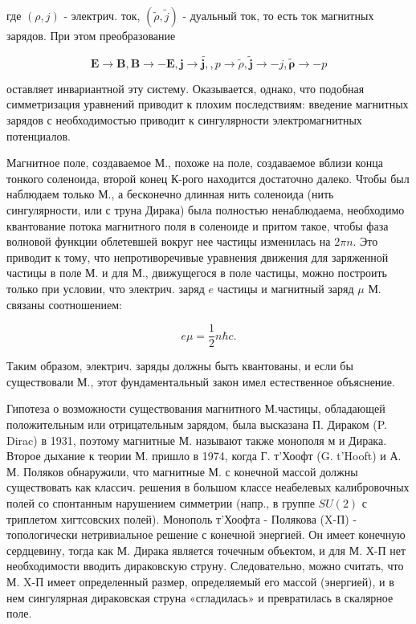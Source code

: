 \documentclass[10pt]{article}
\begin{document}
где $(\rho, j)$ - электрич. ток, $(\widetilde{\rho}, \widetilde{j})$ - дуальный ток, то есть ток магнитных зарядов. При этом преобразование



\[

\boldsymbol{E} \rightarrow \boldsymbol{B}, \boldsymbol{B} \rightarrow-\boldsymbol{E}, \boldsymbol{j} \rightarrow \tilde{\boldsymbol{j},}, p \rightarrow \tilde{\rho}, \tilde{\boldsymbol{j}} \rightarrow-j, \tilde{\boldsymbol{\rho}} \rightarrow-p

\]



оставляет инвариантной эту систему. Оказывается, однако, что подобная симметризация уравнений приводит к плохим последствиям: введение магнитных зарядов с необходимостью приводит к сингулярности электромагнитных потенциалов.



Магнитное поле, создаваемое М., похоже на поле, создаваемое вблизи конца тонкого соленоида, второй конец К-рого находится достаточно далеко. Чтобы был наблюдаем только М., а бесконечно длинная нить соленоида (нить сингулярности, или с труна Дирака) была полностью ненаблюдаема, необходимо квантование потока магнитного поля в соленоиде и притом такое, чтобы фаза волновой функции облетевшей вокруг нее частицы изменилась на $2 \pi n$. Это приводит к тому, что непротиворечивые уравнения движения для заряженной частицы в поле М. и для М., движущегося в поле частицы, можно построить только при условии, что электрич. заряд $e$ частицы и магнитный заряд $\mu$ М. связаны соотношением:



\[

e \mu=\frac{1}{2} n \hbar c .

\]



Таким образом, электрич. заряды должны быть квантованы, и если бы существовали М., этот фундаментальный закон имел естественное объяснение.



Гипотеза о возможности существования магнитного М.частицы, обладающей положительным или отрицательным зарядом, была высказана П. Дираком (P. Dirac) в 1931, поэтому магнитные М. называют также монополя м и Дирака. Второе дыхание к теории М. пришло в 1974, когда Г. т'Хоофт (G. t'Hooft) и А. М. Поляков обнаружили, что магнитные М. с конечной массой должны существовать как классич. решения в большом классе неабелевых калибровочных полей со спонтанным нарушением симметрии (напр., в группе $S U(2)$ с триплетом хигтсовских полей). Монополь т'Хоофта - Полякова (X-П) - топологически нетривиальное решение с конечной энергией. Он имеет конечную сердцевину, тогда как М. Дирака является точечным объектом, и для М. Х-П нет необходимости вводить дираковскую струну. Следовательно, можно считать, что М. X-П имеет определенный размер, определяемый его массой (энергией), и в нем сингулярная дираковская струна «сгладилась» и превратилась в скалярное поле.
\end{document}
